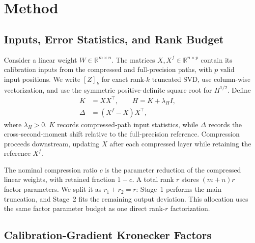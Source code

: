 \documentclass[11pt]{article}
\begin{document}
\section{Method}\label{sec:method}



\subsection{Inputs, Error Statistics, and Rank Budget}\label{sec:preliminaries}

Consider a linear weight $W\in\mathbb R^{m\times n}$. The matrices $X,X^f\in\mathbb R^{n\times p}$ contain its calibration inputs from the compressed and full-precision paths, with $p$ valid input positions. We write $[Z]_k$ for exact rank-$k$ truncated SVD, use column-wise vectorization, and use the symmetric positive-definite square root for $H^{1/2}$. Define
\begin{equation}
\begin{aligned}
K&=XX^\top,\qquad H=K+\lambda_H I,\\
\Delta&=(X^f-X)X^\top,
\end{aligned}
\label{eq:input-statistics}
\end{equation}
where $\lambda_H>0$. $K$ records compressed-path input statistics, while $\Delta$ records the cross-second-moment shift relative to the full-precision reference. Compression proceeds downstream, updating $X$ after each compressed layer while retaining the reference $X^f$.

The nominal compression ratio $c$ is the parameter reduction of the compressed linear weights, with retained fraction $1-c$. A total rank $r$ stores $(m+n)r$ factor parameters. We split it as $r_1+r_2=r$: Stage~1 performs the main truncation, and Stage~2 fits the remaining output deviation. This allocation uses the same factor parameter budget as one direct rank-$r$ factorization.

\subsection{Calibration-Gradient Kronecker Factors}\label{sec:fisher}
\end{document}
